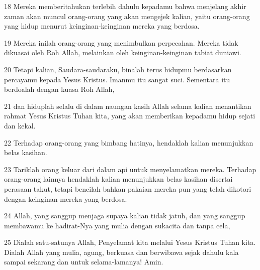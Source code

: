 \par 18 Mereka memberitahukan terlebih dahulu kepadamu bahwa menjelang akhir zaman akan muncul orang-orang yang akan mengejek kalian, yaitu orang-orang yang hidup menurut keinginan-keinginan mereka yang berdosa.
\par 19 Mereka inilah orang-orang yang menimbulkan perpecahan. Mereka tidak dikuasai oleh Roh Allah, melainkan oleh keinginan-keinginan tabiat duniawi.
\par 20 Tetapi kalian, Saudara-saudaraku, binalah terus hidupmu berdasarkan percayamu kepada Yesus Kristus. Imanmu itu sangat suci. Sementara itu berdoalah dengan kuasa Roh Allah,
\par 21 dan hiduplah selalu di dalam naungan kasih Allah selama kalian menantikan rahmat Yesus Kristus Tuhan kita, yang akan memberikan kepadamu hidup sejati dan kekal.
\par 22 Terhadap orang-orang yang bimbang hatinya, hendaklah kalian menunjukkan belas kasihan.
\par 23 Tariklah orang keluar dari dalam api untuk menyelamatkan mereka. Terhadap orang-orang lainnya hendaklah kalian menunjukkan belas kasihan disertai perasaan takut, tetapi bencilah bahkan pakaian mereka pun yang telah dikotori dengan keinginan mereka yang berdosa.
\par 24 Allah, yang sanggup menjaga supaya kalian tidak jatuh, dan yang sanggup membawamu ke hadirat-Nya yang mulia dengan sukacita dan tanpa cela,
\par 25 Dialah satu-satunya Allah, Penyelamat kita melalui Yesus Kristus Tuhan kita. Dialah Allah yang mulia, agung, berkuasa dan berwibawa sejak dahulu kala sampai sekarang dan untuk selama-lamanya! Amin.


